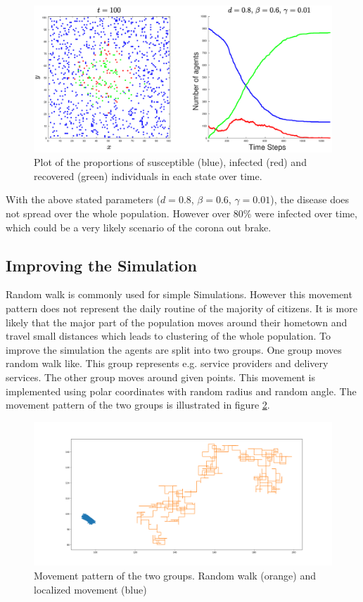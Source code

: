 \begin{figure}[H]
	\centering
	\includegraphics[width=0.9\linewidth]{1_1000_agents}
	\caption{Plot of the proportions of susceptible (blue), infected (red) and recovered (green) individuals in each state over time.}%
	\label{fig:2}
\end{figure}

With the above stated parameters ($d=0.8$, $\beta=0.6$, $\gamma=0.01$), the disease does not spread over the whole population. However over 80\% were infected over time, which could be a very likely scenario of the corona out brake.

\subsection{Improving the Simulation}
Random walk is commonly used for simple Simulations. However this movement pattern does not represent the daily routine of the majority of citizens. It  is more likely that the major part of the population moves around their hometown and travel small distances which leads to clustering of the whole population. To improve the simulation the agents are split into two groups. One group moves random walk like. This group represents e.g. service providers and delivery services. The other group moves around given points. This movement is implemented using polar coordinates with random radius and random angle. The movement pattern of the two groups is illustrated in figure \ref{fig:movementPattern}. 
\begin{figure}[H]
	\centering
	\includegraphics[width=0.9\linewidth]{docs/img/movementPattern.png}
	\caption{Movement pattern of the two groups. Random walk (orange) and localized movement (blue)}%
	\label{fig:movementPattern}
\end{figure}

